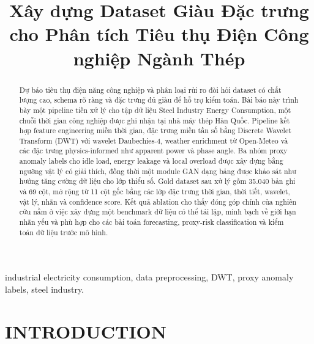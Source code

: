 \documentclass[conference]{IEEEtran}
\begin{document}
\title{Xây dựng Dataset Giàu Đặc trưng cho Phân tích Tiêu thụ Điện Công nghiệp Ngành Thép}

\author{
}

\maketitle

\begin{abstract}
Dự báo tiêu thụ điện năng công nghiệp và phân loại rủi ro đòi hỏi dataset có chất lượng cao, schema rõ ràng và đặc trưng đủ giàu để hỗ trợ kiểm toán. Bài báo này trình bày một pipeline tiền xử lý cho tập dữ liệu Steel Industry Energy Consumption, một chuỗi thời gian công nghiệp được ghi nhận tại nhà máy thép Hàn Quốc. Pipeline kết hợp feature engineering miền thời gian, đặc trưng miền tần số bằng Discrete Wavelet Transform (DWT) với wavelet Daubechies-4, weather enrichment từ Open-Meteo và các đặc trưng physics-informed như apparent power và phase angle. Ba nhóm proxy anomaly labels cho idle load, energy leakage và local overload được xây dựng bằng ngưỡng vật lý có giải thích, đồng thời một module GAN dạng bảng được khảo sát như hướng tăng cường dữ liệu cho lớp thiểu số. Gold dataset sau xử lý gồm 35.040 bản ghi và 69 cột, mở rộng từ 11 cột gốc bằng các lớp đặc trưng thời gian, thời tiết, wavelet, vật lý, nhãn và confidence score. Kết quả ablation cho thấy đóng góp chính của nghiên cứu nằm ở việc xây dựng một benchmark dữ liệu có thể tái lập, minh bạch về giới hạn nhãn yếu và phù hợp cho các bài toán forecasting, proxy-risk classification và kiểm toán dữ liệu trước mô hình.
\end{abstract}

\begin{IEEEkeywords}
industrial electricity consumption, data preprocessing, DWT, proxy anomaly labels, steel industry.
\end{IEEEkeywords}


\section{INTRODUCTION}
\label{sec:introduction}
\end{document}
